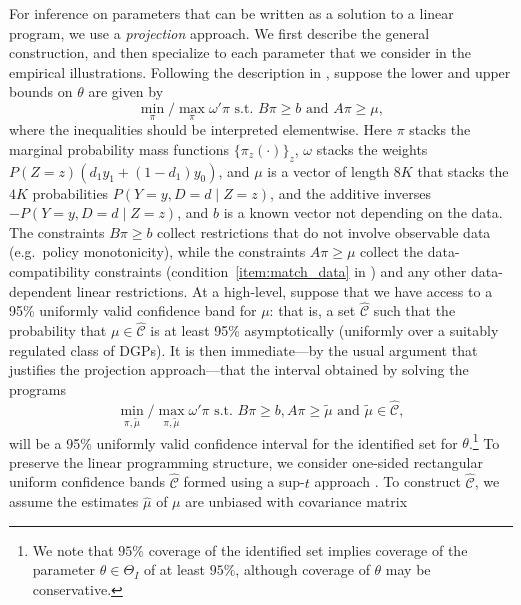\documentclass[12pt]{article}%
\theoremstyle{definition}
\newcommand\1{\operatorname{I}\indicatorfence}
\begin{document}
\begin{appendices}
For inference on parameters that can be written as a solution to a linear
program, we use a \emph{projection} approach. We first describe the general
construction, and then specialize to each parameter that we consider in the
empirical illustrations. Following the description in
, suppose the lower and upper bounds on $\theta$ are given by
\begin{equation}\label{eq:lp_implementation}
\min_{\pi} / \max_{\pi} \omega'\pi \text{ s.t. } B\pi\geq b \text{ and } A\pi\geq\mu,
\end{equation}
where the inequalities should be interpreted elementwise. Here $\pi$ stacks the marginal probability mass functions $\{\pi_{z}(\cdot)\}_{z}$, $\omega$ stacks the weights
$P(Z=z)(d_{1}y_{1}+(1-d_{1})y_{0})$, and $\mu$ is a vector of length $8K$ that
stacks the $4K$ probabilities $P(Y=y, D=d\mid Z=z)$, and the additive inverses
$-P(Y=y, D=d\mid Z=z)$, and $b$ is a known vector not depending on the data.  The constraints $B\pi\geq b$ collect restrictions that
do not involve observable data (e.g.\ policy monotonicity), while the
constraints $A\pi\geq \mu$ collect the data-compatibility constraints
(condition~\ref{item:match_data} in ) and any other data-dependent linear restrictions. At a high-level, suppose that we have access to a 95\% uniformly valid confidence band for $\mu$: that is, a set $\hat{\mathcal{C}}$ such that the probability that $\mu \in \hat{\mathcal{C}}$ is at least 95\% asymptotically (uniformly over a suitably regulated class of DGPs). It is then immediate---by the usual argument that justifies the projection approach---that the interval obtained by solving the programs
\begin{equation}\label{eqn:lp_projection_CS}
\min_{\pi,\tilde\mu} / \max_{\pi,\tilde\mu} \omega'\pi \text{ s.t. } B\pi\geq b, A\pi\geq \tilde\mu \text{ and } \tilde\mu \in \hat{\mathcal{C}},
\end{equation}
will be a 95\% uniformly valid confidence interval for the identified set for
$\theta$.\footnote{We note that $95\%$ coverage of the identified set implies
  coverage of the parameter $\theta \in \Theta_I$ of at least $95\%$, although
  coverage of $\theta$ may be conservative.} To preserve the linear programming
structure, we consider one-sided rectangular uniform confidence bands
$\hat{\mathcal{C}}$ formed using a sup-$t$ approach \parencite[as in,
e.g.,][]{olea_simultaneous_2019}. To construct $\hat{\mathcal{C}}$, we assume
the estimates $\hat{\mu}$ of $\mu$ are unbiased with covariance matrix

\end{appendices}
\end{document}
